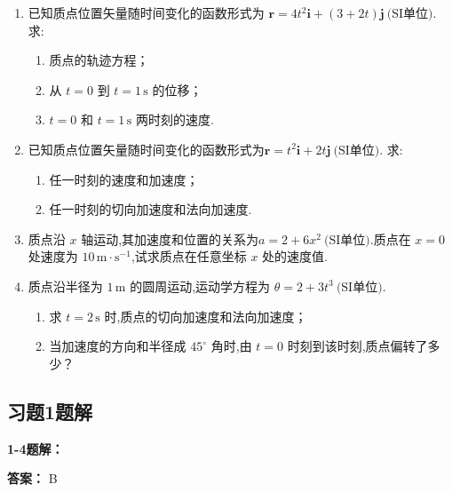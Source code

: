 \begin{enumerate}
\item[\textbf{1-18}] 已知质点位置矢量随时间变化的函数形式为
$\mathbf{r}=4t^2\mathbf{i}+(3+2t)\mathbf{j}\ \text{(SI单位)}.$
求:
\begin{enumerate}
	\item 质点的轨迹方程；
	\item 从 \(t=0\) 到 \(t=1\,\text{s}\) 的位移；
	\item \(t=0\) 和 \(t=1\,\text{s}\) 两时刻的速度.
\end{enumerate}


\item[\textbf{1-20}] 已知质点位置矢量随时间变化的函数形式为$\mathbf{r}=t^2\mathbf{i}+2t\mathbf{j}\ \text{(SI单位)}.$
求:
\begin{enumerate}
	\item 任一时刻的速度和加速度；
	\item 任一时刻的切向加速度和法向加速度.
\end{enumerate}

\item[\textbf{1-25}] 质点沿 \(x\) 轴运动,其加速度和位置的关系为$a=2+6x^2\ \text{(SI单位)}.$质点在 \(x=0\) 处速度为 \(10\,\text{m}\cdot\text{s}^{-1}\),试求质点在任意坐标 \(x\) 处的速度值.

\item[\textbf{1-26}] 质点沿半径为 \(1\,\text{m}\) 的圆周运动,运动学方程为
$\theta=2+3t^3\ \text{(SI单位)}.$

\begin{enumerate}
	\item 求 \(t=2\,\text{s}\) 时,质点的切向加速度和法向加速度；
	\item 当加速度的方向和半径成 \(45^\circ\) 角时,由 \(t=0\) 时刻到该时刻,质点偏转了多少？
\end{enumerate}

\end{enumerate}

\subsection*{习题1题解}

\textbf{1-4题解：}
\setcounter{equation}{0}
\renewcommand{\theHequation}{1-4.\arabic{equation}}

\textbf{答案：} B

